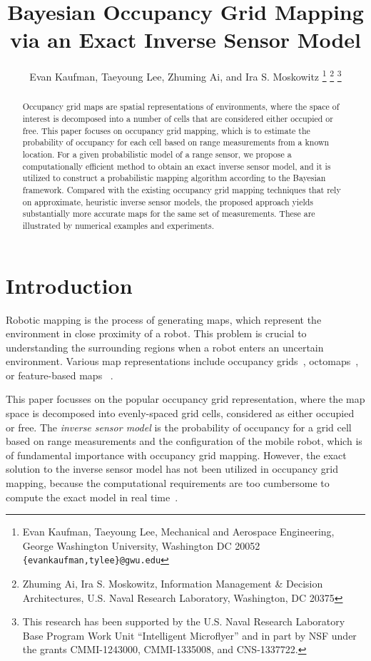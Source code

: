 \documentclass[letterpaper, 10pt, conference]{ieeeconf}
\title{\LARGE \bf
Bayesian Occupancy Grid Mapping via an Exact Inverse Sensor Model}
\author{Evan Kaufman, Taeyoung Lee, Zhuming Ai, and Ira S. Moskowitz%
\thanks{Evan Kaufman, Taeyoung Lee, Mechanical and Aerospace Engineering, George Washington University, Washington DC 20052 {\tt \{evankaufman,tylee\}@gwu.edu}}
\thanks{Zhuming Ai, Ira S. Moskowitz, Information Management \& Decision Architectures, U.S. Naval Research Laboratory,  Washington, DC 20375}
\thanks{This research has been supported by the U.S. Naval Research Laboratory Base Program Work Unit ``Intelligent Microflyer'' and in part by NSF under the grants CMMI-1243000, CMMI-1335008, and CNS-1337722.}
}
\begin{document}
\allowdisplaybreaks


\maketitle \thispagestyle{empty} \pagestyle{empty}

\begin{abstract}
Occupancy grid maps are spatial representations of environments, where the space of interest is decomposed into a number of cells that are considered either occupied or free. This paper focuses on occupancy grid mapping, which is to estimate the probability of occupancy for each cell based on range measurements from a known location. For a given probabilistic model of a range sensor, we propose a computationally efficient method to obtain an exact inverse sensor model, and it is utilized to construct a probabilistic mapping algorithm according to the Bayesian framework. Compared with the existing occupancy grid mapping techniques that rely on approximate, heuristic inverse sensor models, the proposed approach yields substantially more accurate maps for the same set of measurements. These are illustrated by numerical examples and experiments. 
\end{abstract}

\section{Introduction}

Robotic mapping is the process of generating maps, which represent the environment in close proximity of a robot. 
This problem is crucial to understanding the surrounding regions when a robot enters an uncertain environment.
Various map representations include occupancy grids~\cite{WolSuk05}, octomaps~\cite{WurHorBenStaBur10}, or feature-based maps%
~\cite{MonThrKolWeg02}.

This paper focusses on the popular occupancy grid representation, where the map space is decomposed into evenly-spaced grid cells, considered as either occupied or free.
The \emph{inverse sensor model} is the probability of occupancy for a grid cell based on range measurements and the configuration of the mobile robot, which is of fundamental importance with occupancy grid mapping. However, the exact solution to the inverse sensor model has not been utilized in occupancy grid mapping, because the computational requirements are too cumbersome to compute the exact model in real time~\cite{ThrBurFox05}.
\end{document}
